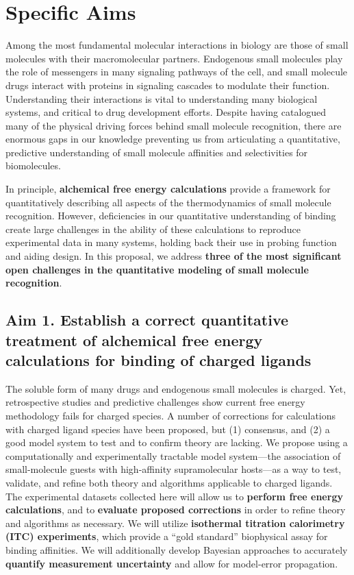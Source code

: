 \documentclass[10pt,final]{article}
\date{}
\begin{document}
\newpage
\section*{\centering Specific Aims}
Among the most fundamental molecular interactions in biology are those of small molecules with their macromolecular partners.
Endogenous small molecules play the role of messengers in many signaling pathways of the cell, and small molecule drugs interact with proteins in signaling cascades to modulate their function.
Understanding their interactions is vital to understanding many biological systems, and critical to drug development efforts.
Despite having catalogued many of the physical driving forces behind small molecule recognition, there are enormous gaps in our knowledge preventing us from articulating a quantitative, predictive understanding of small molecule affinities and selectivities for biomolecules.

In principle, \textbf{alchemical free energy calculations} provide a framework for quantitatively describing all aspects of the thermodynamics of small molecule recognition. However, deficiencies in our quantitative understanding of binding create large challenges in the ability of these calculations to reproduce experimental data in many systems, holding back their use in probing function and aiding design.
In this proposal, we address \textbf{three of the most significant open challenges in the quantitative modeling of small molecule recognition}.

\subsection*{Aim 1. Establish a correct quantitative treatment of alchemical free energy calculations for binding of charged ligands}
The soluble form of many drugs and endogenous small molecules is charged.
Yet, retrospective studies and predictive challenges show current free energy methodology fails for charged species\cite{Rocklin2013b,Muddana2014a}.
A number of corrections for calculations with charged ligand species have been proposed, but (1) consensus, and (2) a good model system to test and to confirm theory are lacking.
We propose using a computationally and experimentally tractable model system---the association of small-molecule guests with high-affinity supramolecular hosts---as a way to test, validate, and refine both theory and algorithms applicable to charged ligands.
The experimental datasets collected here will allow us to \textbf{ perform free energy calculations}, and to \textbf{ evaluate proposed corrections} in order to refine theory and algorithms as necessary.
We will utilize \textbf{ isothermal titration calorimetry (ITC) experiments}, which provide a “gold standard” biophysical assay for binding affinities.
We will additionally develop Bayesian approaches to accurately \textbf{ quantify measurement uncertainty} and allow for model-error propagation. 
\end{document}

